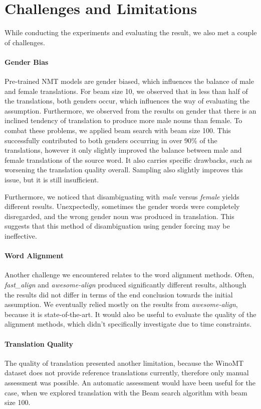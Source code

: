 \section{Challenges and Limitations}
\label{sec:Discussion:Challenges}

While conducting the experiments and evaluating the result, we also met a couple of challenges.

\paragraph{Gender Bias}
Pre-trained NMT models are gender biased, which influences the balance of male and female translations. For beam size 10, we observed that in less than half of the translations, both genders occur, which influences the way of evaluating the assumption. Furthermore, we observed from the results on gender that there is an inclined tendency of translation to produce more male nouns than female. To combat these problems, we applied beam search with beam size 100. This successfully contributed to both genders occurring in over 90\% of the translations, however it only slightly improved the balance between male and female translations of the source word. It also carries specific drawbacks, such as worsening the translation quality overall. Sampling also slightly improves this issue, but it is still insufficient.

Furthermore, we noticed that disambiguating with \textit{male} versus \textit{female} yields different results. Unexpectedly, sometimes the gender words were completely disregarded, and the wrong gender noun was produced in translation. This suggests that this method of disambiguation using gender forcing may be ineffective.

\paragraph{Word Alignment}
Another challenge we encountered relates to the word alignment methods. Often, \textit{fast\_align} and \textit{awesome-align} produced significantly different results, although the results did not differ in terms of the end conclusion towards the initial assumption. We eventually relied mostly on the results from \textit{awesome-align}, because it is state-of-the-art. It would also be useful to evaluate the quality of the alignment methods, which didn't specifically investigate due to time constraints.

\paragraph{Translation Quality}
The quality of translation presented another limitation, because the WinoMT dataset does not provide reference translations currently, therefore only manual assessment was possible. An automatic assessment would have been useful for the case, when we explored translation with the Beam search algorithm with beam size 100.

